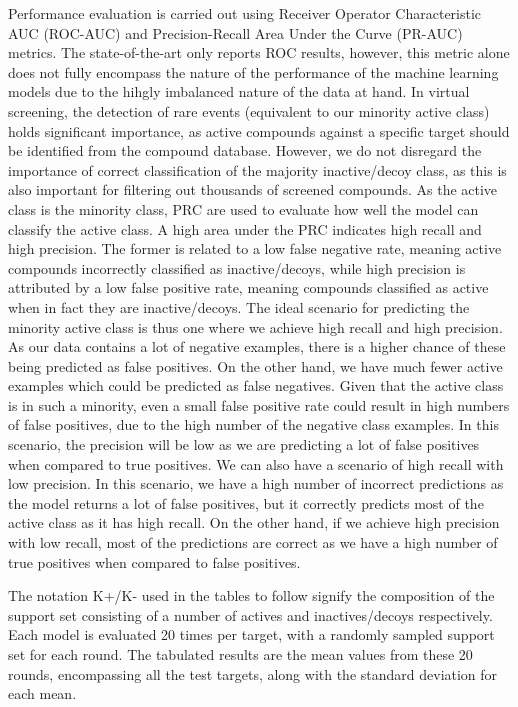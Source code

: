 \documentclass[journal=acscii,manuscript=article]{achemso}
\begin{document}
Performance evaluation is carried out using Receiver Operator Characteristic AUC (ROC-AUC) and Precision-Recall Area Under the Curve (PR-AUC) metrics. The state-of-the-art \cite{altae2017low} only reports ROC results, however, this metric alone does not fully encompass the nature of the performance of the machine learning models due to the hihgly imbalanced nature of the data at hand. In virtual screening, the detection of rare events (equivalent to our minority active class) holds significant importance, as active compounds against a specific target should be identified from the compound database. However, we do not disregard the importance of correct classification of the majority inactive/decoy class, as this is also important for filtering out thousands of screened compounds. As the active class is the minority class, PRC are used to evaluate how well the model can classify the active class. A high area under the PRC indicates high recall and high precision. The former is related to a low false negative rate, meaning active compounds incorrectly classified as inactive/decoys, while high precision is attributed by a low false positive rate, meaning compounds classified as active when in fact they are inactive/decoys. The ideal scenario for predicting the minority active class is thus one where we achieve high recall and high precision. As our data contains a lot of negative examples, there is a higher chance of these being predicted as false positives. On the other hand, we have much fewer active examples which could be predicted as false negatives. Given that the active class is in such a minority, even a small false positive rate could result in high numbers of false positives, due to the high number of the negative class examples. In this scenario, the precision will be low as we are predicting a lot of false positives when compared to true positives. We can also have a scenario of high recall with low precision. In this scenario, we have a high number of incorrect predictions as the model returns a lot of false positives, but it correctly predicts most of the active class as it has high recall. On the other hand, if we achieve high precision with low recall, most of the predictions are correct as we have a high number of true positives when compared to false positives.

The notation K+/K- used in the tables to follow signify the composition of the support set consisting of a number of actives and inactives/decoys respectively. Each model is evaluated 20 times per target, with a randomly sampled support set for each round. The tabulated results are the mean values from these 20 rounds, encompassing all the test targets, along with the standard deviation for each mean.
\end{document}
